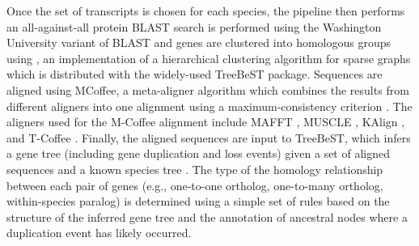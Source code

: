 Once the set of transcripts is chosen for each species, the \cmp
pipeline then performs an all-against-all protein BLAST search is
performed using the Washington University variant of BLAST
\citep{Chao1992} and genes are clustered into homologous groups using
\hclust \citep{Ruan2008}, an implementation of a hierarchical
clustering algorithm for sparse graphs which is distributed with the
widely-used TreeBeST package. Sequences are aligned using MCoffee, a
meta-aligner algorithm which combines the results from different
aligners into one alignment using a maximum-consistency criterion
\citep{Wallace2006}. The aligners used for the M-Coffee alignment
include MAFFT \citep{Katoh2005}, MUSCLE \citep{Edgar2004}, KAlign
\citep{Lassmann2009}, and T-Coffee \citep{Notredame2000}. Finally, the
aligned sequences are input to TreeBeST, which infers a gene tree
(including gene duplication and loss events) given a set of aligned
sequences and a known species tree \citep{Ruan2008}. The type of the
homology relationship between each pair of genes (e.g., one-to-one
ortholog, one-to-many ortholog, within-species paralog) is determined
using a simple set of rules based on the structure of the inferred
gene tree and the annotation of ancestral nodes where a duplication
event has likely occurred.


